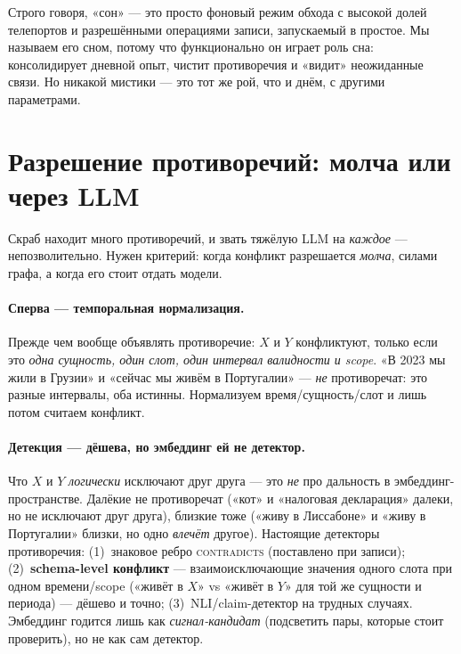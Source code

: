 \begin{intuition}
Строго говоря, «сон» — это просто фоновый режим обхода с высокой долей телепортов и
разрешёнными операциями записи, запускаемый в простое. Мы называем его сном, потому
что функционально он играет роль сна: консолидирует дневной опыт, чистит
противоречия и «видит» неожиданные связи. Но никакой мистики — это тот же рой, что
и днём, с другими параметрами.
\end{intuition}

\section{Разрешение противоречий: молча или через LLM}
\label{sec:conflict}

Скраб находит много противоречий, и звать тяжёлую LLM на \emph{каждое} — непозволительно.
Нужен критерий: когда конфликт разрешается \emph{молча}, силами графа, а когда его
стоит отдать модели.

\paragraph{Сперва — темпоральная нормализация.} Прежде чем вообще объявлять
противоречие: $X$ и $Y$ конфликтуют, только если это \emph{одна сущность, один слот,
один интервал валидности и scope}. «В 2023 мы жили в Грузии» и «сейчас мы живём в
Португалии» — \emph{не} противоречат: это разные интервалы, оба истинны. Нормализуем
время/сущность/слот и лишь потом считаем конфликт.

\paragraph{Детекция — дёшева, но эмбеддинг ей не детектор.} Что $X$ и $Y$
\emph{логически} исключают друг друга — это \emph{не} про дальность в эмбеддинг-
пространстве. Далёкие не противоречат («кот» и «налоговая декларация» далеки, но не
исключают друг друга), близкие тоже («живу в Лиссабоне» и «живу в Португалии» близки,
но одно \emph{влечёт} другое). Настоящие детекторы противоречия: (1)~знаковое ребро
\textsc{contradicts} (поставлено при записи); (2)~\textbf{schema-level конфликт} —
взаимоисключающие значения одного слота при одном времени/scope («живёт в $X$» vs
«живёт в $Y$» для той же сущности и периода) — дёшево и точно; (3)~NLI/claim-детектор
на трудных случаях. Эмбеддинг годится лишь как \emph{сигнал-кандидат} (подсветить
пары, которые стоит проверить), но не как сам детектор.


